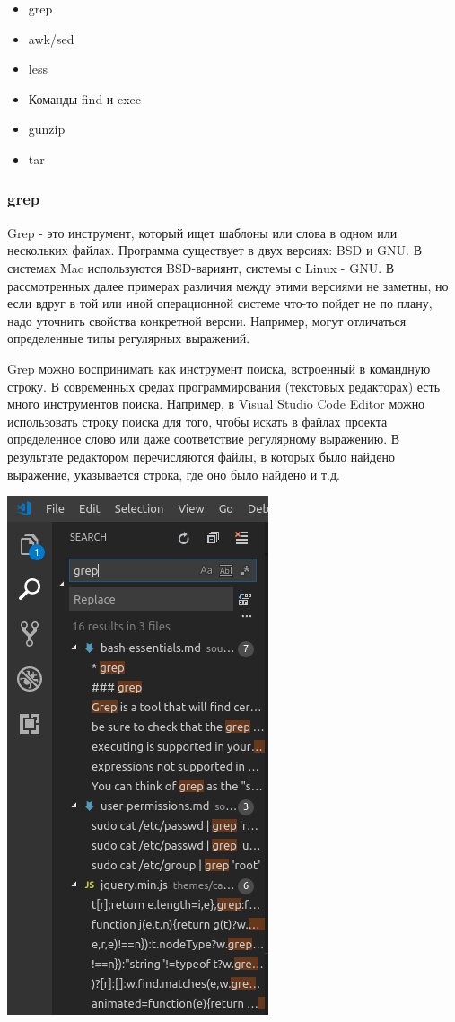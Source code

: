 \documentclass{article}
\begin{document}
\begin{itemize}
\tightlist
\item
  grep
\item
  awk/sed
\item
  less
\item
  Команды find и exec
\item
  gunzip
\item
  tar
\end{itemize}

\hypertarget{grep}{%
\subsubsection{\texorpdfstring{\protect\hyperlink{grep}{}grep}{grep}}\label{grep}}

Grep - это инструмент, который ищет шаблоны или слова в одном или
нескольких файлах. Программа существует в двух версиях: BSD и GNU. В
системах Mac используются BSD-вариянт, системы с Linux - GNU. В
рассмотренных далее примерах различия между этими версиями не заметны,
но если вдруг в той или иной операционной системе что-то пойдет не по
плану, надо уточнить свойства конкретной версии. Например, могут
отличаться определенные типы регулярных выражений.

Grep можно воспринимать как инструмент поиска, встроенный в командную
строку. В современных средах программирования (текстовых редакторах)
есть много инструментов поиска. Например, в Visual Studio Code Editor
можно использовать строку поиска для того, чтобы искать в файлах проекта
определенное слово или даже соответствие регулярному выражению. В
результате редактором перечисляются файлы, в которых было найдено
выражение, указывается строка, где оно было найдено и т.д.

\includegraphics{blog/2019/bash-essentials/vscode-search.png}
\end{document}
